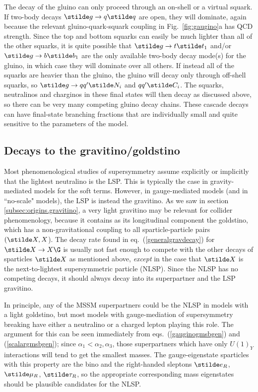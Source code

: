 The decay of the gluino can only proceed through an on-shell or a virtual
squark. If two-body decays
$
\stilde g \rightarrow q\stilde q
$
are open, they will dominate, again because the relevant
gluino-quark-squark coupling in Fig.~\ref{fig:gaugino}a has QCD strength.
Since the top and bottom squarks can easily be much
lighter than all of the other squarks, it is quite possible that
$
\stilde g \rightarrow t \stilde t_1$ and/or
$\stilde g \rightarrow b \stilde b_1$
are the only available two-body decay mode(s) for the gluino,
in which case they will dominate over all others.
If instead all of the squarks are heavier than the gluino, the gluino
will decay only through off-shell squarks, so
$
\stilde g
\rightarrow
q q^\prime \stilde N_i$ and $
q q^\prime \stilde C_i
$.
The squarks, neutralinos and charginos in these final states
will then decay as discussed above,
so there can be very many competing gluino decay chains.
These cascade decays can have final-state branching
fractions that are individually small and quite sensitive to the
parameters of the model.

\subsection{Decays to the
gravitino/goldstino}\label{subsec:decays.gravitino}

Most phenomenological studies of supersymmetry assume explicitly
or implicitly that the lightest neutralino is the LSP.
This is typically the case in gravity-mediated models for the soft terms.
However, in gauge-mediated models (and in ``no-scale" models), the LSP
is instead the gravitino.
As we saw in section \ref{subsec:origins.gravitino}, a very light
gravitino may be relevant
for collider phenomenology, because it contains as its longitudinal
component the goldstino, which has a non-gravitational coupling
to all sparticle-particle pairs $(\stilde X, X$). The decay rate found in
eq.~(\ref{generalgravdecay}) for $\stilde X\rightarrow X\G$ is usually
not fast enough to compete with the other decays of sparticles $\stilde X$
as mentioned above,
{\it except} in the case that $\stilde X$ is the
next-to-lightest supersymmetric particle (NLSP). Since the NLSP has no
competing
decays, it should always decay into its superpartner and the LSP
gravitino.

In principle, any of the MSSM superpartners could be the NLSP in models
with a light goldstino,
but most models with gauge-mediation of supersymmetry breaking 
have either a neutralino
or a charged lepton playing this role. The argument for this can be seen
immediately from eqs.~(\ref{gauginogmsbgen}) and (\ref{scalargmsbgen});
since $\alpha_1 <
\alpha_2,\alpha_3$, those superpartners which have only $U(1)_Y$
interactions will tend to get the smallest masses. The gauge-eigenstate
sparticles with this property are the bino and the right-handed sleptons
$\stilde e_R$, $\stilde \mu_R$, $\stilde \tau_R$, so the appropriate
corresponding mass eigenstates should be plausible candidates for the
NLSP.

